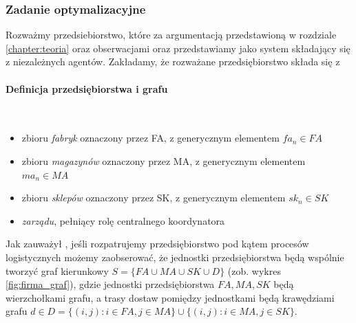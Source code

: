 \documentclass[polish, twoside, 12pt, a4paper]{article}
\theoremstyle{definition}
\theoremstyle{plain}
\theoremstyle{remark}
\begin{document}
\newpage

\subsubsection{Zadanie optymalizacyjne} \label{chapter:zadanie}

Rozważmy przedsiebiorstwo, które za argumentacją przedstawioną w rozdziale \ref{chapter:teoria} oraz obserwacjami  \cite{Moyaux2006} oraz \cite{Kawa2010} przedstawiamy jako system składający się z niezależnych agentów. Zakładamy, że rozważane przedsiębiorstwo składa się z 

\paragraph{Definicja przedsiębiorstwa i grafu}\mbox{}\\

	\begin{itemize} 
		\item zbioru \textit{fabryk} oznaczony przez FA, z generycznym elementem $fa_n \in FA$
		\item zbioru \textit{magazynów} oznaczony przez MA, z generycznym elementem $ma_n \in MA$
		\item zbioru \textit{sklepów} oznaczony przez SK, z generycznym elementem $sk_n \in SK$
		\item \textit{zarządu}, pełniący rolę centralnego koordynatora
	\end{itemize}

Jak zauważył \cite{Kawa2010}, jeśli rozpatrujemy przedsiębiorstwo pod kątem procesów logistycznych możemy zaobserować, że jednostki przedsiębiorstwa będą wspólnie tworzyć graf kierunkowy $S = \{FA \cup MA \cup SK \cup D\}$ (zob. wykres \ref{fig:firma_graf}), gdzie jednostki przedsiębiorstwa $FA, MA, SK$ będą wierzchołkami grafu, a trasy dostaw pomiędzy jednostkami będą krawędziami grafu  $d \in D = \{(i,j) : i \in FA, j \in MA\} \cup \{(i,j) : i \in MA, j \in SK\}$. 
\end{document}
